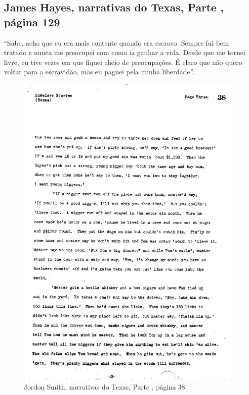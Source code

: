 \subsection{James Hayes, narrativas do Texas, Parte , página 129} \label{ref129}

``Sabe, acho que eu era mais contente quando era escravo. Sempre fui bem
tratado e nunca me preocupei com como ia ganhar a vida. Desde que me
tornei livre, eu tive vezes em que fiquei cheio de preocupações. É claro
que não quero voltar para a escravidão, mas eu paguei pela minha
liberdade''.

\pagebreak
\thispagestyle{empty}
\movetoevenpage
\thispagestyle{empty}
\begin{absolutelynopagebreak}
\begin{vplace}
\begin{figure}[H]
\begin{adjustwidth}{-1.6cm}{}
  \vspace*{-2cm}
  \includegraphics[width=133mm]{./imgs/Cap3.jpg}  
\end{adjustwidth}
  \caption{Jordon Smith, narrativas do Texas, Parte , página 38}
\end{figure}
\end{vplace}

\end{absolutelynopagebreak}

